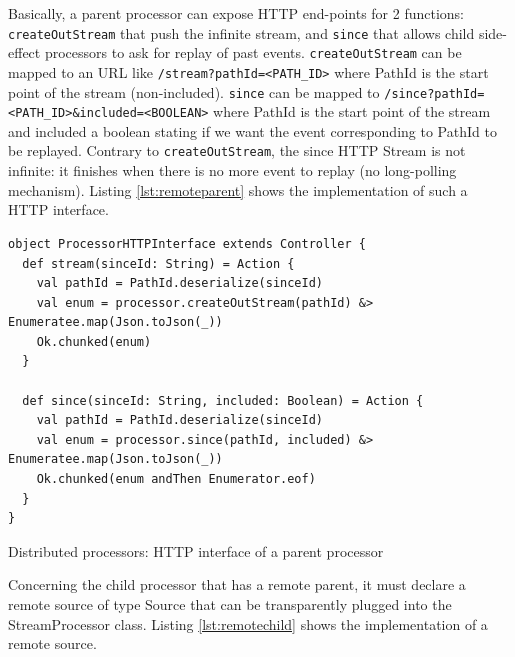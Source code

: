 Basically, a parent processor can expose HTTP end-points for 2 functions: \verb|createOutStream| that push the infinite stream, and \verb|since| that allows child side-effect processors to ask for replay of past events.
\verb|createOutStream| can be mapped to an URL like \verb|/stream?pathId=<PATH_ID>| where PathId is the start point of the stream (non-included).
\verb|since| can be mapped to \verb|/since?pathId=<PATH_ID>&included=<BOOLEAN>| where PathId is the start point of the stream and included a boolean stating if we want the event
corresponding to PathId to be replayed. Contrary to \verb|createOutStream|, the since HTTP Stream is not infinite: it finishes when there is no more event to replay (no long-polling mechanism).
Listing \ref{lst:remoteparent} shows the implementation of such a HTTP interface.

\begin{listing}[h]
\begin{verbatim}
object ProcessorHTTPInterface extends Controller {
  def stream(sinceId: String) = Action {
    val pathId = PathId.deserialize(sinceId)
    val enum = processor.createOutStream(pathId) &> Enumeratee.map(Json.toJson(_))
    Ok.chunked(enum)
  }

  def since(sinceId: String, included: Boolean) = Action {
    val pathId = PathId.deserialize(sinceId)
    val enum = processor.since(pathId, included) &> Enumeratee.map(Json.toJson(_))
    Ok.chunked(enum andThen Enumerator.eof)
  }
}
\end{verbatim}
\caption{Distributed processors: HTTP interface of a parent processor}
\label{lst:remoteparent}
\end{listing}

Concerning the child processor that has a remote parent, it must declare a remote source of type Source that can be transparently plugged into the StreamProcessor class. Listing \ref{lst:remotechild} shows the implementation of a remote source.


